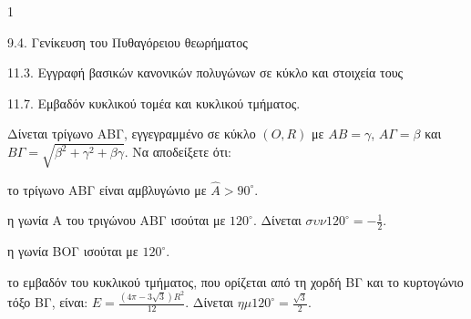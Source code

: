 \begin{ylh}{1}
    \item 9.4. Γενίκευση του Πυθαγόρειου θεωρήματος
    \item 11.3. Εγγραφή βασικών κανονικών πολυγώνων σε κύκλο και στοιχεία τους
    \item 11.7. Εμβαδόν κυκλικού τομέα και κυκλικού τμήματος.
\end{ylh}
Δίνεται τρίγωνο ΑΒΓ, εγγεγραμμένο σε κύκλο $(O,R)$ με $AB=\gamma$, $A\Gamma= \beta$ και $B\Gamma=\sqrt{\beta^2 + \gamma^2 + \beta\gamma}$. Να αποδείξετε ότι:
\begin{alist}
\item το τρίγωνο ΑΒΓ είναι αμβλυγώνιο με $\widehat{A} > 90^{\circ}$. 
\item η γωνία Α του τριγώνου ΑΒΓ ισούται με $120^{\circ}$. Δίνεται $\sigma\upsilon\nu 120^{\circ} = -\frac{1}{2}$. 
\item η γωνία ΒΟΓ ισούται με $120^{\circ}$. 
\item το εμβαδόν του κυκλικού τμήματος, που ορίζεται από τη χορδή ΒΓ και το κυρτογώνιο τόξο ΒΓ, είναι: $Ε = \frac{(4\pi - 3\sqrt{3})R^2}{12}$. Δίνεται $\eta\mu 120^{\circ} = \frac{\sqrt{3}}{2}$. 
\end{alist}